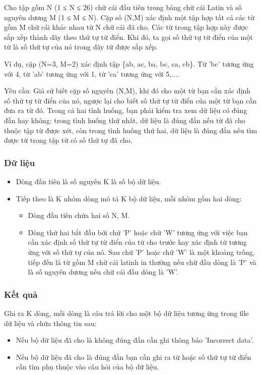 



   Cho tập gồm N (1 ≤ N ≤ 26) chữ cái đầu tiên trong bảng chữ cái Latin và số nguyên dương M (1 ≤ M ≤ N). Cặp số (N,M) xác định một tập hợp tất cả các từ gồm M chữ cái khác nhau từ N chữ cái đã cho. Các từ trong tập hợp này được sắp xếp thành dãy theo thứ tự từ điển. Khi đó, ta gọi số thứ tự từ điển của một từ là số thứ tự của nó trong dãy từ được sắp xếp.  

   Ví dụ, cặp (N=3, M=2) xác định tập \{ab, ac, ba, bc, ca, cb\}. Từ 'bc' tương ứng với 4, từ 'ab' tương ứng với 1, từ 'ca' tương ứng với 5,....  

   Yêu cầu: Giả sử biết cặp số nguyên (N,M), khi đó cho một từ bạn cần xác định số thứ tự từ điển của nó, ngược lại cho biết số thứ tự từ điển của một từ bạn cần đưa ra từ đó. Trong cả hai tình huống, bạn phải kiểm tra xem dữ liệu có đúng đắn hay không: trong tình huống thứ nhất, dữ liệu là đúng đắn nếu từ đã cho thuộc tập từ được xét, còn trong tình huống thứ hai, dữ liệu là đúng đắn nếu tìm được từ trong tập từ có số thứ tự đã cho.  

\subsubsection{   Dữ liệu  }
\begin{itemize}
	\item     Dòng đầu tiên là số nguyên K là số bộ dữ liệu.   
	\item     Tiếp theo là K nhóm dòng mô tả K bộ dữ liệu, mỗi nhóm gồm hai dòng:    
\begin{itemize}
	\item       Dòng đầu tiên chứa hai số N, M.     
	\item       Dòng thứ hai bắt đầu bởi chữ 'P' hoặc chữ 'W' tương ứng với việc bạn cần xác định số thứ tự từ điển của từ cho trước hay xác định từ tương ứng với số thứ tự của nó. Sau chữ 'P' hoặc chữ 'W' là một khoảng trống, tiếp đến là từ gồm M chữ cái latinh in thường nếu chữ đầu dòng là 'P' và là số nguyên dương nếu chữ cái đầu dòng là 'W'.     
\end{itemize}
\end{itemize}

\subsubsection{   Kết quả  }

   Ghi ra K dòng, mỗi dòng là câu trả lời cho một bộ dữ liệu tương ứng trong file dữ liệu và chứa thông tin sau:  
\begin{itemize}
	\item     Nếu bộ dữ liệu đã cho là không đúng đắn cần ghi thông báo 'Incorrect data'.   
	\item     Nếu bộ dữ liệu đã cho là đúng đắn bạn cần ghi ra từ hoặc số thứ tự từ điển cần tìm phụ thuộc vào câu hỏi của bộ dữ liệu.   
\end{itemize}

